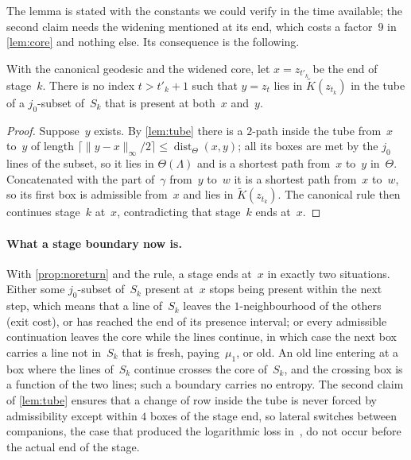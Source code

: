 \documentclass[11pt,letterpaper]{article}
\DeclareMathOperator{\dist}{dist}
\begin{document}
The lemma is stated with the constants we could verify in the time available; the second claim needs the widening mentioned at its end, which costs a factor~$9$ in \cref{lem:core} and nothing else. Its consequence is the following.

\begin{proposition}
\label{prop:noreturn}
With the canonical geodesic and the widened core, let $x=z_{t'_k}$ be the end of stage~$k$. There is no index $t>t'_k+1$ such that $y=z_t$ lies in $\widetilde K(z_{t_k})$ in the tube of a $j_0$-subset of~$S_k$ that is present at both~$x$ and~$y$.
\end{proposition}

\begin{proof}
Suppose~$y$ exists. By \cref{lem:tube} there is a $2$-path inside the tube from~$x$ to~$y$ of length $\lceil\lVert y-x\rVert_\infty/2\rceil\le\dist_\Theta(x,y)$; all its boxes are met by the $j_0$ lines of the subset, so it lies in $\Theta(\Lambda)$ and is a shortest path from~$x$ to~$y$ in~$\Theta$. Concatenated with the part of~$\gamma$ from~$y$ to~$w$ it is a shortest path from~$x$ to~$w$, so its first box is admissible from~$x$ and lies in $\widetilde K(z_{t_k})$. The canonical rule then continues stage~$k$ at~$x$, contradicting that stage~$k$ ends at~$x$.
\end{proof}

\paragraph{What a stage boundary now is.} With \cref{prop:noreturn} and the rule, a stage ends at~$x$ in exactly two situations. Either some $j_0$-subset of~$S_k$ present at~$x$ stops being present within the next step, which means that a line of~$S_k$ leaves the $1$-neighbourhood of the others (exit cost), or has reached the end of its presence interval; or every admissible continuation leaves the core while the lines continue, in which case the next box carries a line not in~$S_k$ that is fresh, paying~$\mu_1$, or old. An old line entering at a box where the lines of~$S_k$ continue crosses the core of~$S_k$, and the crossing box is a function of the two lines; such a boundary carries no entropy. The second claim of \cref{lem:tube} ensures that a change of row inside the tube is never forced by admissibility except within $4$ boxes of the stage end, so lateral switches between companions, the case that produced the logarithmic loss in~\cite[Section~8]{DEC26}, do not occur before the actual end of the stage.
\end{document}
